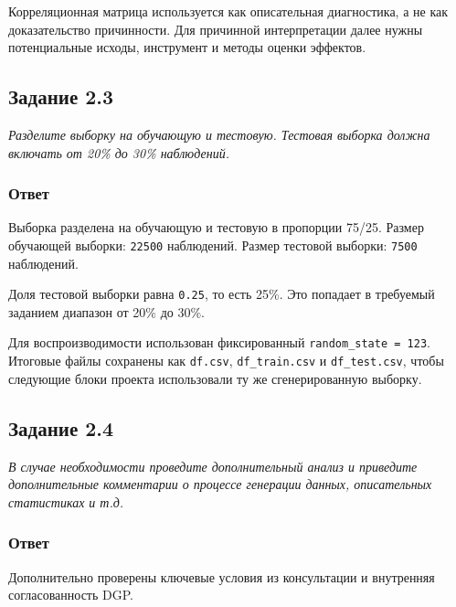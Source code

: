 \documentclass[11pt]{article}
\newenvironment{tasktext}
      {\begin{tcolorbox}[breakable, colback=black!3, colframe=black!28,
        boxrule=0.4pt, arc=1.5mm, left=7pt, right=7pt, top=5pt, bottom=5pt,
        before skip=0.35em, after skip=0.75em]\itshape}
      {\end{tcolorbox}}
\begin{document}
Корреляционная матрица используется как описательная диагностика, а не
как доказательство причинности. Для причинной интерпретации далее нужны
потенциальные исходы, инструмент и методы оценки эффектов.

    \subsection{Задание 2.3}\label{ux437ux430ux434ux430ux43dux438ux435-2.3}

\begin{tasktext}
Разделите выборку на обучающую и тестовую. Тестовая выборка должна
включать от 20\% до 30\% наблюдений.
\end{tasktext}

\subsubsection{Ответ}\label{ux43eux442ux432ux435ux442}

Выборка разделена на обучающую и тестовую в пропорции 75/25. Размер
обучающей выборки: \texttt{22500} наблюдений. Размер тестовой выборки:
\texttt{7500} наблюдений.

Доля тестовой выборки равна \texttt{0.25}, то есть 25\%. Это попадает в
требуемый заданием диапазон от 20\% до 30\%.

Для воспроизводимости использован фиксированный
\texttt{random\_state\ =\ 123}. Итоговые файлы сохранены как
\texttt{df.csv}, \texttt{df\_train.csv} и \texttt{df\_test.csv}, чтобы
следующие блоки проекта использовали ту же сгенерированную выборку.

    \subsection{Задание 2.4}\label{ux437ux430ux434ux430ux43dux438ux435-2.4}

\begin{tasktext}
В случае необходимости проведите дополнительный анализ и приведите
дополнительные комментарии о процессе генерации данных, описательных
статистиках и т.д.
\end{tasktext}

\subsubsection{Ответ}\label{ux43eux442ux432ux435ux442}

Дополнительно проверены ключевые условия из консультации и внутренняя
согласованность DGP.
\end{document}
